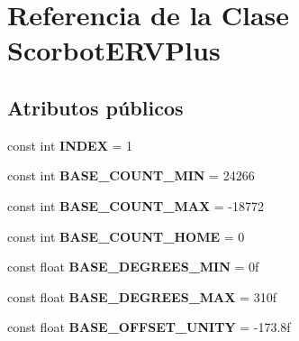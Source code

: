 \hypertarget{class_scorbot_e_r_v_plus}{}\section{Referencia de la Clase Scorbot\+E\+R\+V\+Plus}
\label{class_scorbot_e_r_v_plus}
\subsection*{Atributos públicos}
\begin{DoxyCompactItemize}
\item 
\mbox{\label{class_scorbot_e_r_v_plus_a39277ade90b7379615feb1d49b1595ff}} 
const int {\bfseries I\+N\+D\+EX} = 1
\item 
\mbox{\label{class_scorbot_e_r_v_plus_ac514e69b6ff313f215a800936dc50149}} 
const int {\bfseries B\+A\+S\+E\+\_\+\+C\+O\+U\+N\+T\+\_\+\+M\+IN} = 24266
\item 
\mbox{\label{class_scorbot_e_r_v_plus_afde727c33c8d0cc003b2f49ab536eba2}} 
const int {\bfseries B\+A\+S\+E\+\_\+\+C\+O\+U\+N\+T\+\_\+\+M\+AX} = -\/18772
\item 
\mbox{\label{class_scorbot_e_r_v_plus_ae7a67981cf8958d87b36aa8e47fbbf06}} 
const int {\bfseries B\+A\+S\+E\+\_\+\+C\+O\+U\+N\+T\+\_\+\+H\+O\+ME} = 0
\item 
\mbox{\label{class_scorbot_e_r_v_plus_a83ed9065cb4e0f810ea9b232aeaa38c0}} 
const float {\bfseries B\+A\+S\+E\+\_\+\+D\+E\+G\+R\+E\+E\+S\+\_\+\+M\+IN} = 0f
\item 
\mbox{\label{class_scorbot_e_r_v_plus_ab465d61f3d062c26b194859a5bab41b7}} 
const float {\bfseries B\+A\+S\+E\+\_\+\+D\+E\+G\+R\+E\+E\+S\+\_\+\+M\+AX} = 310f
\item 
\mbox{\label{class_scorbot_e_r_v_plus_a4389f35a8cfc607dbf6160560a141027}} 
const float {\bfseries B\+A\+S\+E\+\_\+\+O\+F\+F\+S\+E\+T\+\_\+\+U\+N\+I\+TY} = -\/173.\+8f
\item 
\mbox{\label{class_scorbot_e_r_v_plus_af1ea7c400e83cdae45bca92c9cc2e6b1}} 

\end{DoxyCompactItemize}
